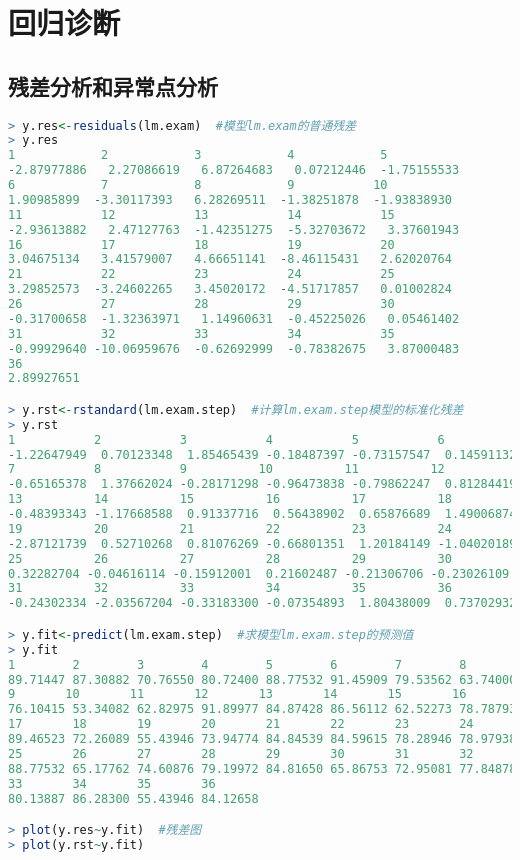 \documentclass[11pt,a4paper,oneside]{book}
\begin{document}
\section{回归诊断}
\subsection{残差分析和异常点分析}
\begin{lstlisting}[language=r]
> y.res<-residuals(lm.exam)  #模型lm.exam的普通残差
> y.res
1            2            3            4            5 
-2.87977886   2.27086619   6.87264683   0.07212446  -1.75155533 
6            7            8            9           10 
1.90985899  -3.30117393   6.28269511  -1.38251878  -1.93838930 
11           12           13           14           15 
-2.93613882   2.47127763  -1.42351275  -5.32703672   3.37601943 
16           17           18           19           20 
3.04675134   3.41579007   4.66651141  -8.46115431   2.62020764 
21           22           23           24           25 
3.29852573  -3.24602265   3.45020172  -4.51717857   0.01002824 
26           27           28           29           30 
-0.31700658  -1.32363971   1.14960631  -0.45225026   0.05461402 
31           32           33           34           35 
-0.99929640 -10.06959676  -0.62692999  -0.78382675   3.87000483 
36 
2.89927651

> y.rst<-rstandard(lm.exam.step)  #计算lm.exam.step模型的标准化残差
> y.rst
1           2           3           4           5           6 
-1.22647949  0.70123348  1.85465439 -0.18487397 -0.73157547  0.14591132 
7           8           9          10          11          12 
-0.65165378  1.37662024 -0.28171298 -0.96473838 -0.79862247  0.81284419 
13          14          15          16          17          18 
-0.48393343 -1.17668588  0.91337716  0.56438902  0.65876689  1.49006874 
19          20          21          22          23          24 
-2.87121739  0.52710268  0.81076269 -0.66801351  1.20184149 -1.04020189 
25          26          27          28          29          30 
0.32282704 -0.04616114 -0.15912001  0.21602487 -0.21306706 -0.23026109 
31          32          33          34          35          36 
-0.24302334 -2.03567204 -0.33183300 -0.07354893  1.80438009  0.73702932 

> y.fit<-predict(lm.exam.step)  #求模型lm.exam.step的预测值
> y.fit
1        2        3        4        5        6        7        8 
89.71447 87.30882 70.76550 80.72400 88.77532 91.45909 79.53562 63.74000 
9       10       11       12       13       14       15       16 
76.10415 53.34082 62.82975 91.89977 84.87428 86.56112 62.52273 78.78793 
17       18       19       20       21       22       23       24 
89.46523 72.26089 55.43946 73.94774 84.84539 84.59615 78.28946 78.97938 
25       26       27       28       29       30       31       32 
88.77532 65.17762 74.60876 79.19972 84.81650 65.86753 72.95081 77.84878 
33       34       35       36 
80.13887 86.28300 55.43946 84.12658 

> plot(y.res~y.fit)  #残差图
> plot(y.rst~y.fit)
\end{lstlisting}
\end{document}
